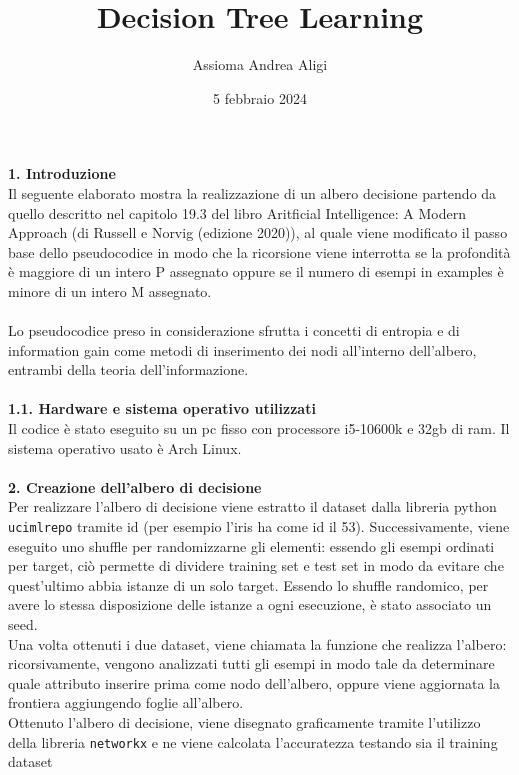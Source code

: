 \documentclass{article}
\begin{document}
\title{\textbf{Decision Tree Learning}}
\author{Assioma Andrea Aligi}
\date{5 febbraio 2024}
\maketitle


{\Large \textbf{1. Introduzione}}\\
Il seguente elaborato mostra la realizzazione di un albero decisione partendo da quello descritto nel capitolo 19.3 del libro Aritficial Intelligence: A Modern Approach  
(di Russell e Norvig (edizione 2020)), al quale viene modificato il passo base dello pseudocodice in modo che la ricorsione viene interrotta se la profondità è maggiore 
di un intero P assegnato oppure se il numero di esempi in examples è minore di un intero M assegnato.\\
\\
Lo pseudocodice preso in considerazione sfrutta i concetti di entropia e di information gain come metodi di inserimento dei nodi all'interno dell'albero, entrambi della teoria
dell'informazione.\\
\\
{\Large \textbf{{\large{1}}.{\small{1}}. Hardware e sistema operativo utilizzati}}\\
Il codice è stato eseguito su un pc fisso con processore i5-10600k e 32gb di ram. Il sistema operativo usato è Arch Linux.\\
\\
{\Large \textbf{2. Creazione dell'albero di decisione}}\\
Per realizzare l'albero di decisione viene estratto il dataset dalla libreria python \texttt{ucimlrepo} tramite id (per esempio l'iris ha come id il 53). Successivamente, viene eseguito uno
shuffle per randomizzarne gli elementi: essendo gli esempi ordinati per target, ciò permette di dividere training set e test 
set in modo da evitare che quest'ultimo abbia istanze di un solo target. Essendo lo shuffle randomico, per avere lo stessa disposizione delle istanze a ogni esecuzione, è stato associato un seed.\\
Una volta ottenuti i due dataset, viene chiamata la funzione che realizza l'albero: ricorsivamente, vengono analizzati tutti gli esempi in modo tale da determinare quale attributo
inserire prima come nodo dell'albero, oppure viene aggiornata la frontiera aggiungendo foglie all'albero.\\
Ottenuto l'albero di decisione, viene disegnato graficamente tramite l'utilizzo della libreria \texttt{networkx} e ne viene calcolata l'accuratezza testando sia il training dataset
\end{document}
